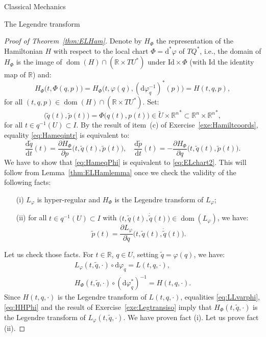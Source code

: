 \documentclass[oneside,a4paper,11pt]{amsbook}
\newcommand{\R}{\mathds R}
\newcommand{\dd}{\mathrm d}
\newcommand{\Id}{\mathrm{Id}}
\DeclareMathOperator{\Dom}{dom}
\theoremstyle{remark}\newtheorem{exercise}{Exercise}[chapter]
\theoremstyle{plain}\newtheorem{teo}{Theorem}[section]
\theoremstyle{plain}\newtheorem{lem}[teo]{Lemma}
\theoremstyle{plain}\newtheorem{prop}[teo]{Proposition}
\theoremstyle{plain}\newtheorem{cor}[teo]{Corollary}
\theoremstyle{definition}\newtheorem{defin}[teo]{Definition}
\theoremstyle{remark}\newtheorem{rem}[teo]{Remark}
\theoremstyle{definition}\newtheorem{notation}[teo]{Notation}
\theoremstyle{definition}\newtheorem{convention}[teo]{Convention}
\theoremstyle{definition}\newtheorem{example}[teo]{Example}
\numberwithin{section}{chapter}
\numberwithin{equation}{section}
\begin{document}
\begin{chapter}{Classical Mechanics}
\begin{section}{The Legendre transform}
\begin{proof}[Proof of Theorem~\ref{thm:ELHam}]
Denote by $H_\Phi$ the representation of the Hamiltonian $H$ with respect to the local chart $\Phi=\dd^*\varphi$ of $TQ^*$, i.e.,
the domain of $H_\Phi$ is the image of $\Dom(H)\cap(\R\times TU^*)$ under $\Id\times\Phi$ (with $\Id$ the identity map of $\R$) and:
\[H_\Phi\big(t,\Phi(q,p)\big)=H_\Phi\big(t,\varphi(q),(\dd\varphi_q^{-1})^*(p)\big)=H(t,q,p),\]
for all $(t,q,p)\in\Dom(H)\cap(\R\times TU^*)$. Set:
\[\big(\tilde q(t),\tilde p(t)\big)=\Phi\big(q(t),p(t)\big)\in\widetilde U\times{\R^n}^*\subset\R^n\times{\R^n}^*,\]
for all $t\in q^{-1}(U)\subset I$.
By the result of item~(c) of Exercise~\ref{exe:Hamiltcoords}, equality \eqref{eq:Hameqintr} is equivalent to:
\begin{equation}\label{eq:HameqPhi}
\frac{\dd\tilde q}{\dd t}(t)=\frac{\partial H_\Phi}{\partial p}\big(t,\tilde q(t),\tilde p(t)\big),\quad
\frac{\dd\tilde p}{\dd t}(t)=-\frac{\partial H_\Phi}{\partial q}\big(t,\tilde q(t),\tilde p(t)\big).
\end{equation}
We have to show that \eqref{eq:HameqPhi} is equivalent to \eqref{eq:ELchart2}. This will follow from Lemma~\ref{thm:ELHamlemma} once we check the validity
of the following facts:
\begin{itemize}
\item[(i)] $L_\varphi$ is hyper-regular and $H_\Phi$ is the Legendre transform of $L_\varphi$;
\item[(ii)] for all $t\in q^{-1}(U)\subset I$ with $\big(t,\tilde q(t),\dot{\tilde q}(t)\big)\in\Dom(L_\varphi)$, we have:
\[\tilde p(t)=\frac{\partial L_\varphi}{\partial\dot q}\big(t,\tilde q(t),\dot{\tilde q}(t)\big).\]
\end{itemize}
Let us check those facts. For $t\in\R$, $q\in U$, setting $\tilde q=\varphi(q)$, we have:
\begin{gather}
\label{eq:LLvarphi}L_\varphi(t,\tilde q,\cdot)\circ\dd\varphi_q=L(t,q,\cdot),\\
\label{eq:HHPhi}H_\Phi(t,\tilde q,\cdot)\circ(\dd\varphi_q^*)^{-1}=H(t,q,\cdot).
\end{gather}
Since $H(t,q,\cdot)$ is the Legendre transform of $L(t,q,\cdot)$, equalities \eqref{eq:LLvarphi}, \eqref{eq:HHPhi} and the result of
Exercise~\ref{exe:Legtransiso} imply that $H_\Phi(t,\tilde q,\cdot)$ is the Legendre transform of $L_\varphi(t,\tilde q,\cdot)$.
We have proven fact (i). Let us prove fact (ii).


\end{proof}
\end{section}
\end{chapter}
\end{document}
